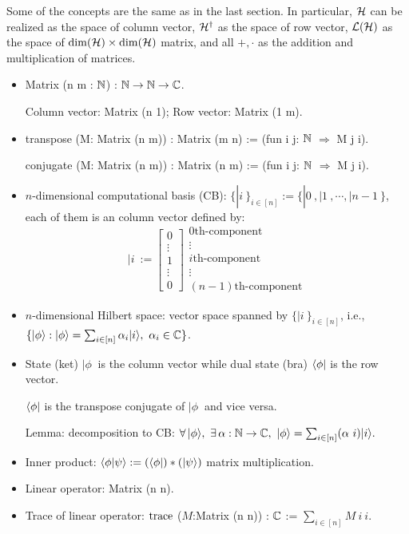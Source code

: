 Some of the concepts are the same as in the last section. In particular, ${\mathcal{H}}$ can be realized as the space of column vector, ${\mathcal{H}}^\dag$ as the space of row vector, ${\mathcal{L}}({\mathcal{H}})$ as the space of $\dim({\mathcal{H}})\times\dim({\mathcal{H}})$ matrix, and all $+,\cdot$ as the addition and multiplication of matrices. 
\begin{itemize}
    \item Matrix (n m : ${\mathbb{N}}$) : ${\mathbb{N}}\rightarrow{\mathbb{N}}\rightarrow{\mathbb{C}}$. 
    
    Column vector: Matrix (n 1); Row vector: Matrix (1 m).
    \item transpose (M: Matrix (n m)) : Matrix (m n) := (fun i j:  ${\mathbb{N}}$ $\Rightarrow$ M j i).
    
    conjugate (M: Matrix (n m)) : Matrix (n m) := (fun i j:  ${\mathbb{N}}$ $\Rightarrow$ M j i).
    
    \item $n$-dimensional computational basis (CB): $\{|i\>\}_{i\in[n]}:=\{|0\>,|1\>,\cdots,|n-1\>\}$, each of them is an column vector defined by:
    $$|i\> := \left[\begin{array}{c}0\\\vdots\\1\\\vdots\\0\end{array}\right]\begin{array}{c}0\text{th-component}\\\vdots\\i\text{th-component}\\\vdots\\(n-1)\text{th-component}\end{array}$$
    \item $n$-dimensional Hilbert space: vector space spanned by $\{|i\>\}_{i\in[n]}$, i.e., $\{|\phi\>: |\phi\> = \sum_{i\in[n]}\alpha_i|i\>,\ \alpha_i\in\complexnumber\}$.
    \item State (ket) $|\phi\>$ is the column vector while dual state (bra) $\langle\phi|$ is the row vector. 
    
    $\langle\phi|$ is the transpose conjugate of $|\phi\>$ and vice versa.
    
    Lemma: decomposition to CB: $\forall\, |\phi\>,\ \exists\, \alpha: \nat\rightarrow\complexnumber,\ |\phi\> = \sum_{i\in[n]}(\alpha\ i)|i\>.$
    \item Inner product: $\langle\phi|\psi\rangle := (\langle\phi|) \ast (|\psi\rangle)$ matrix multiplication.
    \item Linear operator: Matrix (n n).
    \item Trace of linear operator: ${\operatorname{trace}}$ ($M$:Matrix (n n)) : ${\mathbb{C}}$ := $\sum_{i\in[n]} M\ i\ i$.
\end{itemize}


